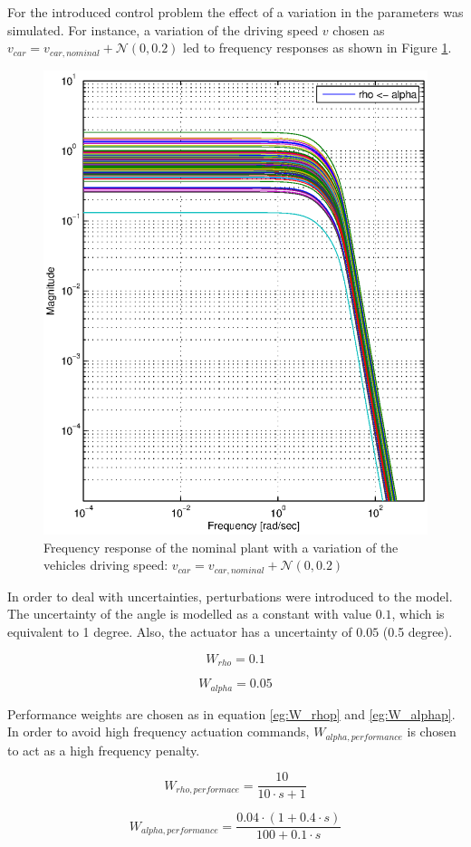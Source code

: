 \documentclass[conference]{IEEEtran}
\begin{document}
For the introduced control problem the effect of a variation in the parameters was simulated. For instance, a variation of the driving speed $v$ chosen as $v_{car} = v_{car,nominal} + \mathcal{N}(0,0.2)$ led to frequency responses as shown in Figure \ref{figure:bode_plant}. 

\begin{figure}[h]
\centering
  \includegraphics[width=.47\textwidth]{pics/bode_plant.eps} 
  \caption{Frequency response of the nominal plant with a variation of the vehicles driving speed: $v_{car} = v_{car,nominal} + \mathcal{N}(0,0.2)$}  
  \label{figure:bode_plant}
\end{figure}

In order to deal with uncertainties, perturbations were introduced to the model. The uncertainty of the angle is modelled as a constant with value $0.1$, which is equivalent to 1 degree. Also, the actuator has a uncertainty of $0.05$ (0.5 degree).

\begin{equation}
\label{eg:W_rho}
{W_{rho}} = 0.1
\end{equation}

\begin{equation}
{W_{alpha}} = 0.05
\end{equation}

Performance weights are chosen as in equation \ref{eg:W_rhop} and \ref{eg:W_alphap}. In order to avoid high frequency actuation commands, $W_{alpha,performance}$ is chosen to act as a high frequency penalty.

\begin{equation}
\label{eg:W_rhop}
{W_{rho,performace}} = \frac{{10}}{{10 \cdot s + 1}}
\end{equation}

\begin{equation}
\label{eg:W_alphap}
{W_{alpha,performance}} = \frac{{0.04 \cdot \left( {1 + 0.4 \cdot s} \right)}}{{100 + 0.1 \cdot s}}
\end{equation}
\end{document}
